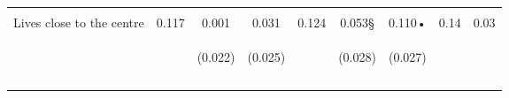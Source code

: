 \begin{tabular}{lcccccccc}
 & \begin{footnotesize}\end{footnotesize} & \begin{footnotesize}[0.041]\end{footnotesize} & \begin{footnotesize}[0.001]\end{footnotesize} & \begin{footnotesize}\end{footnotesize} & \begin{footnotesize}[1.000]\end{footnotesize} & \begin{footnotesize}[0.371]\end{footnotesize} & \begin{footnotesize}\end{footnotesize} & \begin{footnotesize}\end{footnotesize}\\
\noalign{\smallskip}Lives close to the centre & 0.117 & 0.001 & 0.031 & 0.124 & 0.053§ & 0.110• & 0.14 & 0.03\\
 & \begin{footnotesize}\end{footnotesize} & \begin{footnotesize}(0.022)\end{footnotesize} & \begin{footnotesize}(0.025)\end{footnotesize} & \begin{footnotesize}\end{footnotesize} & \begin{footnotesize}(0.028)\end{footnotesize} & \begin{footnotesize}(0.027)\end{footnotesize} & \begin{footnotesize}\end{footnotesize} & \begin{footnotesize}\end{footnotesize}\\
 & \begin{footnotesize}\end{footnotesize} & \begin{footnotesize}[0.240]\end{footnotesize} & \begin{footnotesize}[0.046]\end{footnotesize} & \begin{footnotesize}\end{footnotesize} & \begin{footnotesize}[0.435]\end{footnotesize} & \begin{footnotesize}[0.001]\end{footnotesize} & \begin{footnotesize}\end{footnotesize} & \begin{footnotesize}\end{footnotesize}\\
\noalign{\smallskip}\hline\end{tabular}\\
